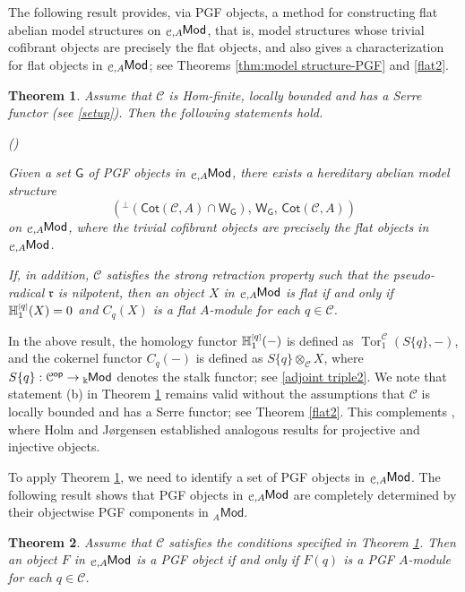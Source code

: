 \documentclass{amsart}
\newtheorem{intthm}{Theorem}[]
\theoremstyle{bfupright head,slanted body}
\theoremstyle{bfupright head,upright body}
\theoremstyle{fixed bf head,slanted body}
\theoremstyle{fixed bf head,upright body}
\theoremstyle{numbered paragraph}
\newlength{\thmlistleft}        %
\newlength{\thmlistright}       %
\newlength{\thmlistpartopsep}   %
\newlength{\thmlisttopsep}      %
\newlength{\thmlistparsep}      %
\newlength{\thmlistitemsep}     %
\newcounter{prt}
\newenvironment{prt}{\begin{list}{\upshape (\alph{prt})}%
		{\usecounter{prt}%
			\setlength{\leftmargin}{\thmlistleft}%
			\setlength{\labelwidth}{\thmlistleft}%
			\setlength{\rightmargin}{\thmlistright}%
			\setlength{\partopsep}{\thmlistpartopsep}%
			\setlength{\topsep}{\thmlisttopsep}%
			\setlength{\parsep}{\thmlistparsep}%
			\setlength{\itemsep}{\thmlistitemsep}}}%
	{\end{list}}%
\numberwithin{equation}{res}
\newcommand{\Cot}[1]{\mathsf{Cot}(#1)}
\newcommand{\Mod}[1]{{_{#1}\mathsf{Mod}}}
\newcommand{\Tor}[4][]{\operatorname{Tor}_{#2}^{#1}(#3,#4)}
\newcommand{\hH}[2][1]{\mathbb{H}_{#1}^{\textnormal{\tiny[}#2\textnormal{\tiny]}}}
\newcommand{\G}{\mathsf{G}}
\newcommand{\WG}{\mathsf{W}_{\mathsf{G}}}
\newcommand{\C}{\mathcal{C}}
\newcommand{\kk}{\Bbbk}
\newcommand{\lMod}[1]{{}_{#1}\mspace{-1mu}{\sf{Mod}}}
\newcommand{\Cop}{\mathcal{C}^{\mathsf{op}}}
\begin{document}
The following result provides, via PGF objects, a method for constructing flat abelian model structures on $\lMod{\C,A}$, that is, model structures whose trivial cofibrant objects are precisely the flat objects, and also gives a characterization for flat objects in $\lMod{\C,A}$; see Theorems \ref{thm:model structure-PGF} and \ref{flat2}.

\begin{intthm}\label{thmA}
Assume that $\C$ is Hom-finite, locally bounded and has a Serre functor (see \ref{setup}). Then the following statements hold.
\begin{prt}
\item Given a set $\G$ of PGF objects in $\lMod{\C,A}$, there exists a hereditary
      abelian model structure
      \[({^{\perp}(\Cot{\C,A}\cap\WG)}, \, \WG, \, \Cot{\C,A})\]
      on $\lMod{\C,A}$, where the trivial cofibrant objects are precisely the flat objects in $\lMod{\C,A}$.

\item If, in addition, $\C$ satisfies the strong retraction property such that the
      pseudo-radical $\mathfrak{r}$ is nilpotent, then an object $X$ in $\lMod{\C,A}$ is flat if and only if $\hH[1]{q}(X)=0$ and $C_q(X)$ is a flat $A$-module for each $q\in\C$.
\end{prt}
\end{intthm}

In the above result, the homology functor $\hH[1]{q}(-)$ is defined as $\Tor[\C]{1}{S\{q\}}{-}$, and the cokernel functor $C_q(-)$ is defined as $S\{q\} \otimes_\C X$, where $S\{q\}: \Cop\to\lMod{\kk}$ denotes the stalk functor; see \ref{adjoint triple2}. We note that statement (b) in Theorem \ref{thmA} remains valid without the assumptions that $\C$ is locally bounded and has a Serre functor; see Theorem \ref{flat2}. This complements \cite[Theorem E]{HJ21}, where Holm and J{\o}rgensen established analogous results for projective and injective objects.

To apply Theorem \ref{thmA}, we need to identify a set of PGF objects in $\lMod{\C,A}$. The following result shows that PGF objects in $\lMod{\C,A}$ are completely determined by their objectwise PGF components in $\Mod{A}$.

\begin{intthm}\label{thmB}
Assume that $\C$ satisfies the conditions specified in Theorem \ref{thmA}. Then an object $F$ in $\lMod{\C,A}$ is a PGF object if and only if $F(q)$ is a PGF $A$-module for each $q\in\C$.
\end{intthm}
\end{document}

